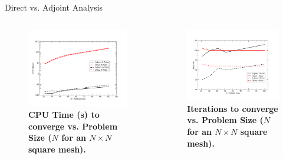 \documentclass{beamer}
\begin{document}
\begin{frame}{Direct vs. Adjoint Analysis}

  \begin{columns}

    \begin{column}{0.5\textwidth}
      \begin{figure}[h!]
        \centering
        \includegraphics[width=2.5in,clip]{Adjoint_Direct_CPU_Time.pdf}
        \caption{\textbf{CPU Time (s) to converge vs. Problem Size
            ($N$ for an $N \times N$ square mesh).} }
      \end{figure}
    \end{column}

    \begin{column}{0.5\textwidth}
      \begin{figure}[h!]
        \centering
        \includegraphics[width=2.5in,clip]{Adjoint_Direct_Iterations.pdf}
        \caption{\textbf{Iterations to converge vs. Problem Size ($N$
            for an $N \times N$ square mesh).} }
      \end{figure}
    \end{column}

  \end{columns}

\end{frame}
\end{document}
